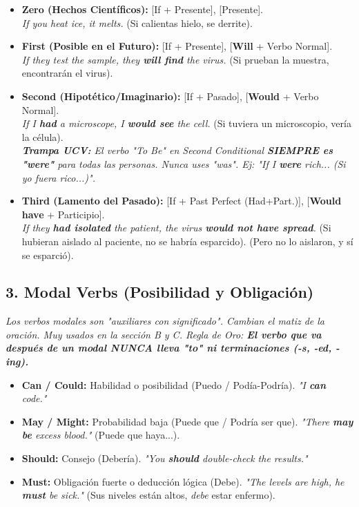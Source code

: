 \documentclass[11pt,a4paper]{article}
\begin{document}
\begin{tcolorbox}[colback=yellow!5,colframe=accent,title=\faBalanceScale \quad La Balanza de los Condicionales]
    \begin{itemize}
        \item \textbf{Zero (Hechos Científicos):} [If + Presente], [Presente]. \\
        \textit{If you heat ice, it melts.} (Si calientas hielo, se derrite).
        
        \item \textbf{First (Posible en el Futuro):} [If + Presente], [\textbf{Will} + Verbo Normal]. \\
        \textit{If they test the sample, they \textbf{will find} the virus.} (Si prueban la muestra, encontrarán el virus).
        
        \item \textbf{Second (Hipotético/Imaginario):} [If + Pasado], [\textbf{Would} + Verbo Normal]. \\
        \textit{If I \textbf{had} a microscope, I \textbf{would see} the cell.} (Si tuviera un microscopio, vería la célula). \\
        \textit{\faExclamationTriangle \textbf{Trampa UCV:} El verbo "To Be" en Second Conditional \textbf{SIEMPRE es "were"} para todas las personas. Nunca uses "was". Ej: "If I \textbf{were} rich... (Si yo fuera rico...)".}
        
        \item \textbf{Third (Lamento del Pasado):} [If + Past Perfect (Had+Part.)], [\textbf{Would have} + Participio]. \\
        \textit{If they \textbf{had isolated} the patient, the virus \textbf{would not have spread}.} (Si hubieran aislado al paciente, no se habría esparcido). (Pero no lo aislaron, y sí se esparció).
    \end{itemize}
\end{tcolorbox}

\subsection{3. Modal Verbs (Posibilidad y Obligación)}
\textit{Los verbos modales son "auxiliares con significado". Cambian el matiz de la oración. Muy usados en la sección B y C. Regla de Oro: \textbf{El verbo que va después de un modal NUNCA lleva "to" ni terminaciones (-s, -ed, -ing).}}

\begin{itemize}
    \item \textbf{Can / Could:} Habilidad o posibilidad (Puedo / Podía-Podría). \textit{"I \textbf{can} code."}
    \item \textbf{May / Might:} Probabilidad baja (Puede que / Podría ser que). \textit{"There \textbf{may be} excess blood."} (Puede que haya...).
    \item \textbf{Should:} Consejo (Debería). \textit{"You \textbf{should} double-check the results."}
    \item \textbf{Must:} Obligación fuerte o deducción lógica (Debe). \textit{"The levels are high, he \textbf{must} be sick."} (Sus niveles están altos, \textit{debe} estar enfermo).
\end{itemize}
\end{document}
